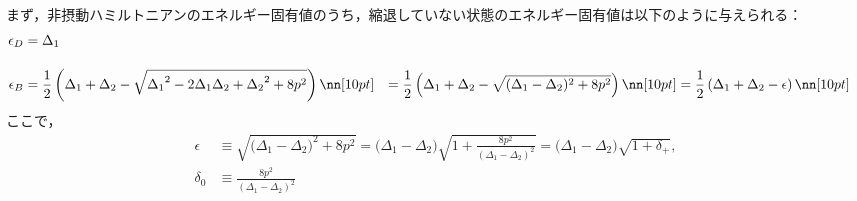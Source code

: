 まず，非摂動ハミルトニアンのエネルギー固有値のうち，縮退していない状態のエネルギー固有値は以下のように与えられる：
\begin{align}
    \epsilon_D&=
    {\Delta_{1}}\\[10pt]
    \epsilon_B&=
    \frac{1}{2}\left({\Delta_{1}}+{\Delta_{2}}-\sqrt{{\Delta_{1}}^2-2{\Delta_{1}}{\Delta_{2}}+{\Delta_{2}}^2+8{p}^2}\right)\nn[10pt]
    &=\frac{1}{2}\left({\Delta_{1}}+{\Delta_{2}}-\sqrt{{
    (\Delta_{1}}-{\Delta_{2}})^2+8{p}^2}\right)\nn[10pt]
    &=\frac{1}{2}\left({\Delta_{1}}+{\Delta_{2}}-\epsilon\right)\nn[10pt]
\end{align}
ここで，
\begin{align}
    \epsilon&\equiv
    \sqrt{{
    (\Delta_{1}}-{\Delta_{2}})^2+8{p}^2}
    ={(\Delta_{1}}-{\Delta_{2}})
    \sqrt{1+\frac{8{p}^2}{(\Delta_{1}-\Delta_{2})^2}}
    ={(\Delta_{1}}-{\Delta_{2}})\sqrt{1+\delta_+},\\[10pt]
    \delta_0 &\equiv \frac{8{p}^2}{(\Delta_{1}-\Delta_{2})^2}
\end{align}
